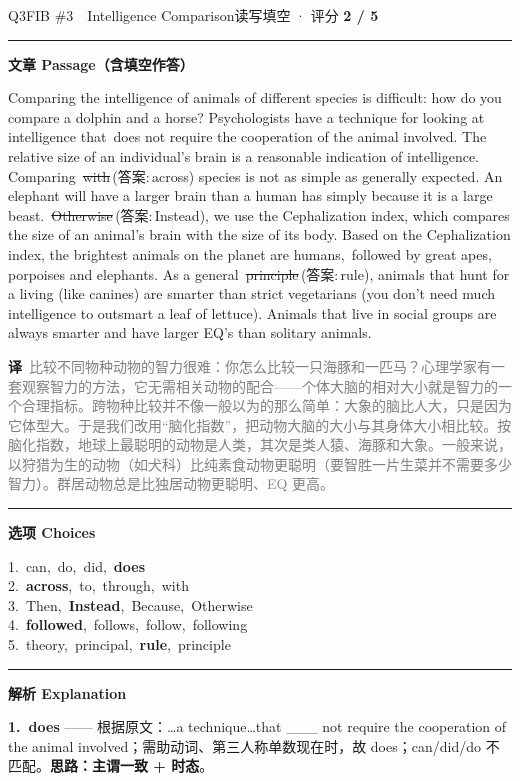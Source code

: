 \documentclass[11pt]{article}
\newcommand{\ptesub}[1]{%
  \par\needspace{2\baselineskip}\smallskip
  {\color{cAccent}\rule[-0.2ex]{3pt}{1.05em}}\hspace{6pt}%
  {\bfseries\color{cHead}#1}\par\nopagebreak\smallskip}
\newcommand{\zh}[1]{{\footnotesize\textcolor{cNote}{\textbf{译}}\ \textcolor{gray}{#1}}}
\newcommand{\rok}[1]{{\color{cFix}\ding{51}\,#1}}                 %
\newcommand{\rno}[2]{{\color{cWrong}\ding{55}\,\sout{#1}}\,{\footnotesize\color{cFix}(答案:\,#2)}}  %
\begin{document}
\begin{qblock}{Q3\quad FIB \#3\ \ Intelligence Comparison}{读写填空 · 评分 \textcolor{cAccent}{\bfseries 2 / 5}}
\ptesub{文章 Passage（含填空作答）}
\begin{promptbox}
Comparing the intelligence of animals of different species is difficult: how do you compare a dolphin and a horse? Psychologists have a technique for looking at intelligence that \rok{does} not require the cooperation of the animal involved. The relative size of an individual's brain is a reasonable indication of intelligence. Comparing \rno{with}{across} species is not as simple as generally expected. An elephant will have a larger brain than a human has simply because it is a large beast. \rno{Otherwise}{Instead}, we use the Cephalization index, which compares the size of an animal's brain with the size of its body. Based on the Cephalization index, the brightest animals on the planet are humans, \rok{followed} by great apes, porpoises and elephants. As a general \rno{principle}{rule}, animals that hunt for a living (like canines) are smarter than strict vegetarians (you don't need much intelligence to outsmart a leaf of lettuce). Animals that live in social groups are always smarter and have larger EQ's than solitary animals.
\end{promptbox}
\zh{比较不同物种动物的智力很难：你怎么比较一只海豚和一匹马？心理学家有一套观察智力的方法，它无需相关动物的配合——个体大脑的相对大小就是智力的一个合理指标。跨物种比较并不像一般以为的那么简单：大象的脑比人大，只是因为它体型大。于是我们改用“脑化指数”，把动物大脑的大小与其身体大小相比较。按脑化指数，地球上最聪明的动物是人类，其次是类人猿、海豚和大象。一般来说，以狩猎为生的动物（如犬科）比纯素食动物更聪明（要智胜一片生菜并不需要多少智力）。群居动物总是比独居动物更聪明、EQ 更高。}
\ptesub{选项 Choices}
{\small
1.\ can,\ do,\ did,\ \textbf{does}\\
2.\ \textbf{across},\ to,\ through,\ with\\
3.\ Then,\ \textbf{Instead},\ Because,\ Otherwise\\
4.\ \textbf{followed},\ follows,\ follow,\ following\\
5.\ theory,\ principal,\ \textbf{rule},\ principle}
\ptesub{解析 Explanation}
\begin{notebox}\footnotesize
\textbf{1.\ does} —— 根据原文：…a technique…that \_\_\_ not require the cooperation of the animal involved；需助动词、第三人称单数现在时，故 does；can/did/do 不匹配。\textbf{思路：主谓一致 + 时态}。\\[2pt]

\end{notebox}
\end{qblock}
\end{document}
